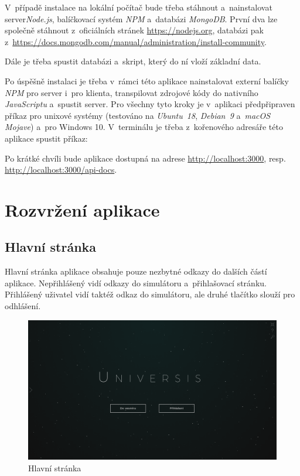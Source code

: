 \documentclass[a4paper,12pt]{article}
\begin{document}
V~případě instalace na lokální počítač bude třeba stáhnout a~nainstalovat server\textit{Node.js}, balíčkovací systém \textit{NPM} a~databázi \textit{MongoDB}. První dva lze společně stáhnout z~oficiálních stránek \url{https://nodejs.org}, databázi pak z~\url{https://docs.mongodb.com/manual/administration/install-community}.

Dále je třeba spustit databázi a~skript, který do ní vloží základní data.



Po úspěšně instalaci je třeba v~rámci této aplikace nainstalovat externí balíčky \textit{NPM} pro server i~pro klienta, transpilovat zdrojové kódy do nativního \textit{JavaScriptu} a~spustit server. Pro všechny tyto kroky je v~aplikaci předpřipraven příkaz pro unixové systémy (testováno na \textit{Ubuntu~18}, \textit{Debian~9} a~\textit{macOS Mojave}) a~pro Windows 10. V~terminálu je třeba z~kořenového adresáře této aplikace spustit příkaz:



Po krátké chvíli bude aplikace dostupná na adrese \url{http://localhost:3000}, resp. \url{http://localhost:3000/api-docs}.

\section{Rozvržení aplikace}

\subsection{Hlavní stránka}

Hlavní stránka aplikace obsahuje pouze nezbytné odkazy do dalších částí aplikace. Nepřihlášený vidí odkazy do simulátoru a~přihlašovací stránku. Přihlášený uživatel vidí taktéž odkaz do simulátoru, ale druhé tlačítko slouží pro odhlášení.

\begin{figure}[H]
\begin{center}
\includegraphics[width=450pt]{Images/MainPage.png}
\caption{Hlavní stránka}
\end{center}
\end{figure}
\end{document}
